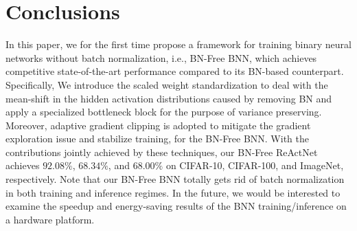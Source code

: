\documentclass[final]{cvpr}
\begin{document}
\section{Conclusions}
In this paper, we for the first time propose a framework for training binary neural networks without batch normalization, i.e., BN-Free BNN, which achieves competitive state-of-the-art performance compared to its BN-based counterpart. Specifically, We introduce the scaled weight standardization to deal with the mean-shift in the hidden activation distributions caused by removing BN and apply a specialized bottleneck block for the purpose of variance preserving. Moreover, adaptive gradient clipping is adopted to mitigate the gradient exploration issue and stabilize training, for the BN-Free BNN. With the contributions jointly achieved by these techniques, our BN-Free ReActNet achieves $92.08\%$, $68.34\%$, and $68.00\%$ on CIFAR-10, CIFAR-100, and ImageNet, respectively. Note that our BN-Free BNN totally gets rid of batch normalization in both training and inference regimes. In the future, we would be interested to examine the speedup and energy-saving results of the BNN training/inference on a hardware platform.



\clearpage

{\small


}
\end{document}
